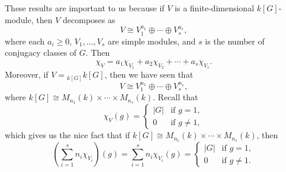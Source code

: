 These results are important to us because if $V$ is a finite-dimensional 
$k[G]$-module, then $V$ decomposes as 
\[ V \cong V_1^{a_1} \oplus \cdots \oplus V_s^{a_s}, \] 
where each $a_i \geq 0$, $V_1, \dots, V_s$ are simple modules, and $s$ 
is the number of conjugacy classes of $G$. Then 
\[ \chi_V = a_1 \chi_{V_1} + a_2 \chi_{V_2} + \cdots + a_s \chi_{V_s}. \] 
Moreover, if $V = {}_{k[G]} k[G]$, then we have seen that 
\[ V \cong V_1^{n_1} \oplus \cdots \oplus V_s^{n_s}, \] 
where $k[G] \cong M_{n_1}(k) \times \cdots \times M_{n_s}(k)$. Recall that 
\[ \chi_V(g) = \begin{cases} |G| & \text{if } g = 1, \\ 0 & \text{if } g \neq 1, 
\end{cases} \] 
which gives us the nice fact that if $k[G] \cong M_{n_1}(k) \times \cdots \times 
M_{n_s}(k)$, then 
\[ \left( \sum_{i=1}^s n_i \chi_{V_i} \right)(g) = \sum_{i=1}^s n_i \chi_{V_i}(g) 
= \begin{cases} |G| & \text{if } g = 1, \\ 0 & \text{if } g \neq 1. \end{cases} \]
